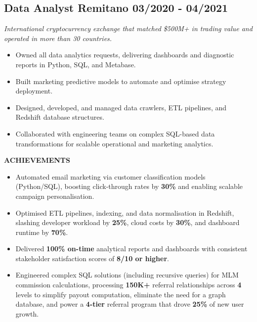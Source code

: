 \documentclass[11pt,a4paper]{article}
\begin{document}
\begin{mdframed}[style=dashedleft]
\vspace{4pt}

\subsection*{Data Analyst \hfill \textbf{Remitano} \hfill 03/2020 - 04/2021}
\textit{International cryptocurrency exchange that matched \$500M+ in trading value and operated in more than 30 countries.}

\begin{itemize}[leftmargin=1.5em, itemsep=4pt]
    \item Owned all data analytics requests, delivering dashboards and diagnostic reports in Python, SQL, and Metabase.
    \item Built marketing predictive models to automate and optimise strategy deployment.
    \item Designed, developed, and managed data crawlers, ETL pipelines, and Redshift database structures.
    \item Collaborated with engineering teams on complex SQL-based data transformations for scalable operational and marketing analytics.
\end{itemize}

\textbf{ACHIEVEMENTS}
\begin{itemize}[leftmargin=1.5em, itemsep=4pt]
    \item Automated email marketing via customer classification models (Python/SQL), boosting click-through rates by \textbf{30\%} and enabling scalable campaign personalisation.
    \item Optimised ETL pipelines, indexing, and data normalisation in Redshift, slashing developer workload by \textbf{25\%}, cloud costs by \textbf{30\%}, and dashboard runtime by \textbf{70\%}.
    \item Delivered \textbf{100\% on-time} analytical reports and dashboards with consistent stakeholder satisfaction scores of \textbf{8/10 or higher}.
    \item Engineered complex SQL solutions (including recursive queries) for MLM commission calculations, processing \textbf{150K+} referral relationships across \textbf{4} levels to simplify payout computation, eliminate the need for a graph database, and power a \textbf{4-tier} referral program that drove \textbf{25\%} of new user growth.
\end{itemize}

\vspace{4pt}


\end{mdframed}
\end{document}
